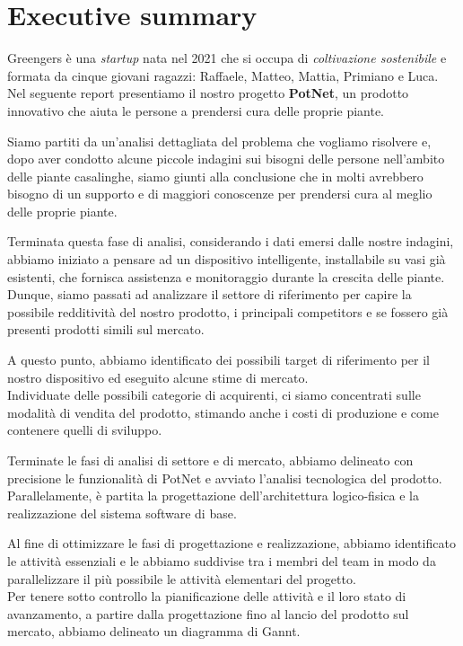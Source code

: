 \section{Executive summary}

Greengers è una \textit{startup} nata nel 2021 che si occupa di \textit{coltivazione sostenibile} e formata da cinque giovani ragazzi: Raffaele, Matteo, Mattia, Primiano e Luca. Nel seguente report presentiamo il nostro progetto \textbf{PotNet}, un prodotto innovativo che aiuta le persone a prendersi cura delle proprie piante.

Siamo partiti da un'analisi dettagliata del problema che vogliamo risolvere e, dopo aver condotto alcune piccole indagini sui bisogni delle persone nell'ambito delle piante casalinghe, siamo giunti alla conclusione che in molti avrebbero bisogno di un supporto e di maggiori conoscenze per prendersi cura al meglio delle proprie piante.

Terminata questa fase di analisi, considerando i dati emersi dalle nostre indagini, abbiamo iniziato a pensare ad un dispositivo intelligente, installabile su vasi già esistenti, che fornisca assistenza e monitoraggio durante la crescita delle piante.\\Dunque, siamo passati ad analizzare il settore di riferimento per capire la possibile redditività del nostro prodotto, i principali competitors e se fossero già presenti prodotti simili sul mercato.

A questo punto, abbiamo identificato dei possibili target di riferimento per il nostro dispositivo ed eseguito alcune stime di mercato.\\Individuate delle possibili categorie di acquirenti, ci siamo concentrati sulle modalità di vendita del prodotto, stimando anche i costi di produzione e come contenere quelli di sviluppo. 

Terminate le fasi di analisi di settore e di mercato, abbiamo delineato con precisione le funzionalità di PotNet e avviato l'analisi tecnologica del prodotto. Parallelamente, è partita la progettazione dell'architettura logico-fisica e la realizzazione del sistema software di base.

Al fine di ottimizzare le fasi di progettazione e realizzazione, abbiamo identificato le attività essenziali e le abbiamo suddivise tra i membri del team in modo da parallelizzare il più possibile le attività elementari del progetto.\\Per tenere sotto controllo la pianificazione delle attività e il loro stato di avanzamento, a partire dalla progettazione fino al lancio del prodotto sul mercato, abbiamo delineato un diagramma di Gannt. 

